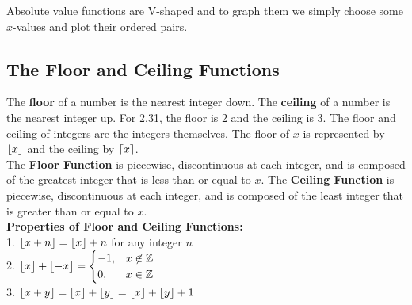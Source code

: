         \noindent Absolute value functions are V-shaped and to graph them we simply choose some
        $x$-values and plot their ordered pairs. \\

        \begin{center}
        \end{center}



    \subsection{The Floor and Ceiling Functions}
        The \textbf{floor} of a number is the nearest integer down. The \textbf{ceiling} of a number
        is the nearest integer up. For 2.31, the floor is 2 and the ceiling is 3. The floor and
        ceiling of integers are the integers themselves. The floor of $x$ is represented by
        $\floor*{x}$ and the ceiling by $\ceil*{x}$. \\

        \noindent The \textbf{Floor Function} is piecewise, discontinuous at each integer, and is
        composed of the greatest integer that is less than or equal to $x$. The
        \textbf{Ceiling Function} is piecewise, discontinuous at each integer, and is composed of
        the least integer that is greater than or equal to $x$.\\

        \noindent \color{purple} \textbf{Properties of Floor and Ceiling Functions:} \color{black} \\
        1. $\floor*{x+n}=\floor*{x}+n$ for any integer $n$ \\
        2. $\floor*{x}+\floor*{-x}=\begin{cases}
                                       -1, & x \not\in \mathbb{Z}\\0, &x\in\mathbb{Z}
        \end{cases}$ \\
        3. $\floor*{x+y}=\floor*{x}+\floor*{y}=\floor*{x}+\floor*{y}+1$ \\

